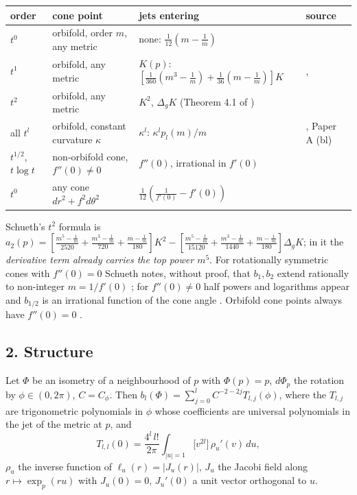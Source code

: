 \begin{center}\small
\begin{tabular}{llll}
order & cone point & jets entering & source\\\hline
$t^0$ & orbifold, order $m$, any metric & none: $\frac1{12}(m-\frac1m)$ & \cite[Prop.~5.5]{dggw2008}\\
$t^1$ & orbifold, any metric & $K(p)$: $[\frac1{360}(m^3-\frac1m)+\frac1{36}(m-\frac1m)]K$ & \cite[5.6]{dggw2008}, \cite[Rem.~4.2]{schueth2019}\\
$t^2$ & orbifold, any metric & $K^2$, $\Delta_gK$ (Theorem 4.1 of \cite{schueth2019}) & \cite[Thm~4.1]{schueth2019}\\
all $t^l$ & orbifold, constant curvature $\kappa$ & $\kappa^l$: $\kappa^lp_l(m)/m$ & \cite{ucar2017}, Paper A (bl)\\
$t^{1/2}$, $t\log t$ & non-orbifold cone, $f''(0)\ne0$ & $f''(0)$, irrational in $f'(0)$ & \cite[(3), Thm~4.1]{schueth2025}\\
$t^0$ & any cone $dr^2+f^2d\theta^2$ & $\frac1{12}(\frac1{f'(0)}-f'(0))$ & \cite[(2)]{schueth2025}
\end{tabular}
\end{center}
Schueth's $t^2$ formula is
$a_2(p)=[\frac{m^5-\frac1m}{2520}+\frac{m^3-\frac1m}{720}+\frac{m-\frac1m}{180}]K^2
-[\frac{m^5-\frac1m}{15120}+\frac{m^3-\frac1m}{1440}+\frac{m-\frac1m}{180}]\Delta_gK$; in it the
\emph{derivative term already carries the top power $m^5$}. For rotationally symmetric cones with
$f''(0)=0$ Schueth notes, without proof, that $b_1,b_2$ extend rationally to non-integer $m=1/f'(0)$
\cite[p.~2]{schueth2025}; for $f''(0)\ne0$ half powers and logarithms appear and $b_{1/2}$ is an
irrational function of the cone angle \cite[Abstract, Thm~4.1]{schueth2025}. Orbifold cone points always
have $f''(0)=0$ \cite[p.~2]{schueth2025}.

\subsection*{2. Structure}

\begin{lemma}\label{vc:pole}
Let $\Phi$ be an isometry of a neighbourhood of $p$ with $\Phi(p)=p$, $d\Phi_p$ the rotation by
$\phi\in(0,2\pi)$, $C=C_\phi$. Then $b_l(\Phi)=\sum_{j=0}^{l}C^{-2-2j}T_{l,j}(\phi)$, where the $T_{l,j}$ are
trigonometric polynomials in $\phi$ whose coefficients are universal polynomials in the jet of the
metric at $p$, and
\begin{equation}\label{vc:top}
T_{l,l}(0)=\frac{4^l\,l!}{2\pi}\int_{|u|=1}\bigl[v^{2l}\bigr]\,\rho_u'(v)\,du ,
\end{equation}
$\rho_u$ the inverse function of $\ell_u(r)=|J_u(r)|$, $J_u$ the Jacobi field along $r\mapsto\exp_p(ru)$ with
$J_u(0)=0$, $J_u'(0)$ a unit vector orthogonal to $u$.
\end{lemma}

